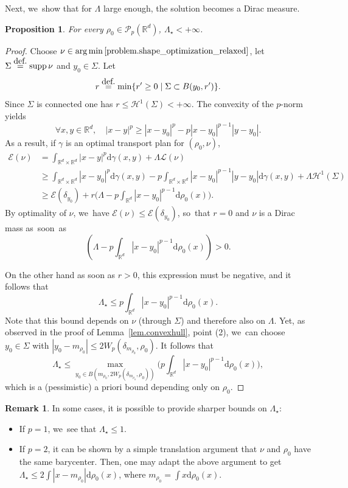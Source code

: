 \documentclass[11pt]{article}
\numberwithin{equation}{section}
\newtheorem{proposition}[theorem]{Proposition}
\theoremstyle{definition}
\newtheorem{remark}[theorem]{Remark}
\newcommand{\eqdef}{\ensuremath{\stackrel{\mbox{\upshape\tiny def.}}{=}}}
\newcommand\E{\mathcal{E}}
\newcommand\cH{\mathcal{H}}
\newcommand\cL{\mathcal{L}}
\newcommand{\RR}{\mathbb{R}}
\DeclareMathOperator*{\argmin}{arg\,min}
\DeclareMathOperator{\supp}{supp}
\newcommand\dd{\mathrm{d}}
\newcommand{\enscond}[2]{\{#1 \mid #2\} }
\newcommand{\abs}[1]{\left\lvert#1\right\rvert}
\begin{document}
Next, we~show that for $\Lambda$ large enough, the solution becomes a Dirac measure.

\begin{proposition}\label{proposition.critical_lambda_upper_bound}
For every $\rho_0 \in \mathcal{P}_p(\RR^d)$, $\Lambda_\star<+\infty$.
\end{proposition}

\begin{proof}
Choose $\nu \in \argmin \eqref{problem.shape_optimization_relaxed}$, let $\Sigma\eqdef \supp \nu$ and $y_0\in\Sigma$.
Let
\[
r\eqdef \min\enscond{r'\geq 0}{\Sigma \subset B(y_0,r')}.
\]
Since
$\Sigma$ is connected one has $r\leq \cH^1(\Sigma)<+\infty$.
The convexity of the $p$-norm yields
\begin{equation*}
\forall x,y \in \RR^d, \quad \abs{x-y}^p \geq \abs{x-y_0}^p -p\abs{x-y_0}^{p-1}\abs{y-y_0}.
\end{equation*}
As a result, if $\gamma$ is an optimal transport plan for $(\rho_0,\nu)$,
\begin{align*}
\E(\nu)&= \int_{\RR^d\times \RR^d}\abs{x-y}^p\dd \gamma(x,y)+\Lambda \cL(\nu)\\
&\geq \int_{\RR^d\times \RR^d}\abs{x-y_0}^p\dd \gamma(x,y) - p\int_{\RR^d\times \RR^d}\abs{x-y_0}^{p-1}\abs{y-y_0}\dd \gamma(x,y)+\Lambda \cH^1(\Sigma)\\
&\geq \E(\delta_{y_0})+ r \biggl(\Lambda - p\int_{\RR^d}\abs{x-y_0}^{p-1}\dd \rho_0(x) \biggr).
\end{align*}
By optimality of $\nu$, we~have $\E(\nu)\leq\E(\delta_{y_0})$, so~that $r=0$ and $\nu$ is a Dirac mass as~soon~as
\[
\left(\Lambda - p\int_{\RR^d}\abs{x-y_0}^{p-1}\dd \rho_0(x)\right)>0.
\]

On the other hand as soon as $r>0$, this expression
must be negative, and it follows that
\[
\Lambda_\star \le p\int_{\RR^d}\abs{x-y_0}^{p-1}\dd \rho_0(x).
\]
Note that this bound depends on $\nu$ (through $\Sigma$) and
therefore also on $\Lambda$.
Yet, as observed in the proof of
Lemma~\ref{lem.convexhull}, point (2), we~can choose $y_0\in\Sigma$
with $|y_0-m_{\rho_0}|\le 2W_p(\delta_{m_{\rho_0}},\rho_0)$. It follows that
\[
\Lambda_\star \le \max_{y_0
\in B(m_{\rho_0},2W_p(\delta_{m_{\rho_0}},\rho_0))}
\biggl(p\int_{\RR^d}\abs{x-y_0}^{p-1}\dd \rho_0(x) \biggr),
\]
which is a (pessimistic) a priori bound depending only on $\rho_0$.
\end{proof}

\begin{remark}
In some cases, it is possible to provide sharper bounds on $\Lambda_\star$:
\begin{itemize}
\item If $p=1$, we~see that $\Lambda_\star\leq 1$.
\item If $p=2$, it can be shown by a simple translation argument that $\nu$ and $\rho_0$ have the same barycenter. Then, one may adapt the above argument to get $\Lambda_\star \leq 2\int\abs{x-m_{\rho_0}}\dd \rho_0(x)$, where $m_{\rho_0}=\int x\dd \rho_0(x)$.
\end{itemize}
\end{remark}
\end{document}
